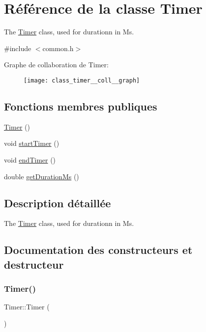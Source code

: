 \hypertarget{class_timer}{}\section{Référence de la classe Timer}
\label{class_timer}


The \hyperlink{class_timer}{Timer} class, used for durationn in Ms.  




{\ttfamily \#include $<$common.\+h$>$}



Graphe de collaboration de Timer\+:
\nopagebreak
\begin{figure}[H]
\begin{center}
\leavevmode
\texttt{[image: class\_timer\_\_coll\_\_graph]}
\end{center}
\end{figure}
\subsection*{Fonctions membres publiques}
\begin{DoxyCompactItemize}
\item 
\hyperlink{class_timer_a5f16e8da27d2a5a5242dead46de05d97}{Timer} ()
\item 
void \hyperlink{class_timer_aa8c887576ec3b0d68c10ebf4097c367c}{start\+Timer} ()
\item 
void \hyperlink{class_timer_aef101eede3d1689a55f25f7164ecafcd}{end\+Timer} ()
\item 
double \hyperlink{class_timer_ae6476c32878861cb4d0a3e650bbe9b6c}{get\+Duration\+Ms} ()
\end{DoxyCompactItemize}


\subsection{Description détaillée}
The \hyperlink{class_timer}{Timer} class, used for durationn in Ms. 

\subsection{Documentation des constructeurs et destructeur}
\mbox{\label{class_timer_a5f16e8da27d2a5a5242dead46de05d97}} 
\subsubsection{\texorpdfstring{Timer()}{Timer()}}
{\footnotesize\ttfamily Timer\+::\+Timer (\begin{DoxyParamCaption}{ }\end{DoxyParamCaption})\hspace{0.3cm}{\ttfamily [inline]}}



